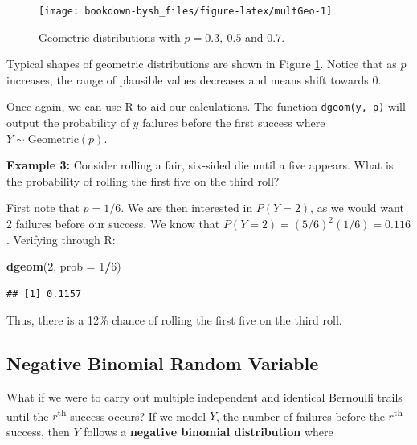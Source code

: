 \documentclass[
]{krantz}
\newenvironment{Shaded}{\begin{snugshade}}{\end{snugshade}}
\newcommand{\DataTypeTok}[1]{\textcolor[rgb]{0.27,0.27,0.27}{#1}}
\newcommand{\DecValTok}[1]{\textcolor[rgb]{0.06,0.06,0.06}{#1}}
\newcommand{\KeywordTok}[1]{\textcolor[rgb]{0.27,0.27,0.27}{\textbf{#1}}}
\newcommand{\NormalTok}[1]{#1}
\newcommand{\OperatorTok}[1]{\textcolor[rgb]{0.43,0.43,0.43}{\textbf{#1}}}
\begin{document}
\begin{figure}

{\centering \texttt{[image: bookdown-bysh\_files/figure-latex/multGeo-1]} 

}

\caption{Geometric distributions with \(p = 0.3,\ 0.5\) and \(0.7\).}\label{fig:multGeo}
\end{figure}

Typical shapes of geometric distributions are shown in Figure \ref{fig:multGeo}. Notice that as \(p\) increases, the range of plausible values decreases and means shift towards 0.

Once again, we can use R to aid our calculations. The function \texttt{dgeom(y,\ p)} will output the probability of \(y\) failures before the first success where \(Y \sim \textrm{Geometric}(p)\).

\textbf{Example 3:} Consider rolling a fair, six-sided die until a five appears. What is the probability of rolling the first five on the third roll?

First note that \(p = 1/6\). We are then interested in \(P(Y=2)\), as we would want 2 failures before our success. We know that \(P(Y=2) = (5/6)^2(1/6) = 0.116\). Verifying through R:

\begin{Shaded}
\begin{Highlighting}[]
\KeywordTok{dgeom}\NormalTok{(}\DecValTok{2}\NormalTok{, }\DataTypeTok{prob =} \DecValTok{1}\OperatorTok{/}\DecValTok{6}\NormalTok{)}
\end{Highlighting}
\end{Shaded}

\begin{verbatim}
## [1] 0.1157
\end{verbatim}

Thus, there is a 12\% chance of rolling the first five on the third roll.

\hypertarget{negative-binomial-random-variable}{%
\subsection{Negative Binomial Random Variable}\label{negative-binomial-random-variable}}

What if we were to carry out multiple independent and identical Bernoulli trails until the \(r\)\textsuperscript{th} success occurs?
If we model \(Y\), the number of failures before the \(r\)\textsuperscript{th} success, then \(Y\) follows a \textbf{negative binomial distribution}  where
\end{document}
